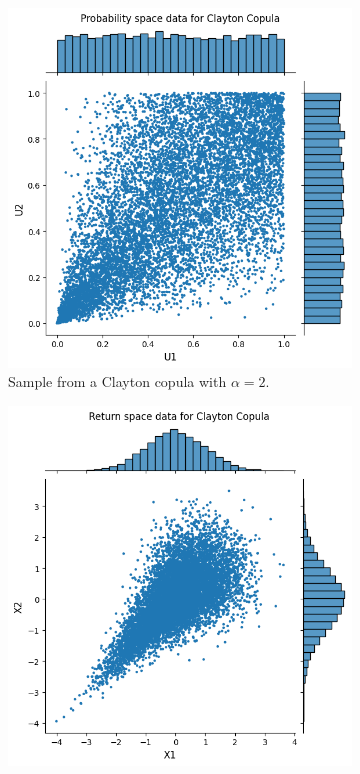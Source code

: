 \begin{figure}[h]
    \centering
    \begin{subfigure}[t]{0.45\linewidth}
        \centering
        \includegraphics[width=\linewidth]{3Theory/pictures/ClaytonProbSpace.png}
        \caption{Sample from a Clayton copula with $\alpha = 2$. } 
        \label{fig:ProbabilitySpaceDataClayton}
    \end{subfigure}
    \hfill
    \begin{subfigure}[t]{0.45\linewidth}
        \centering
        \includegraphics[width=\linewidth]{3Theory/pictures/ClaytonRetSpace.png}

\end{subfigure}
\end{figure}
